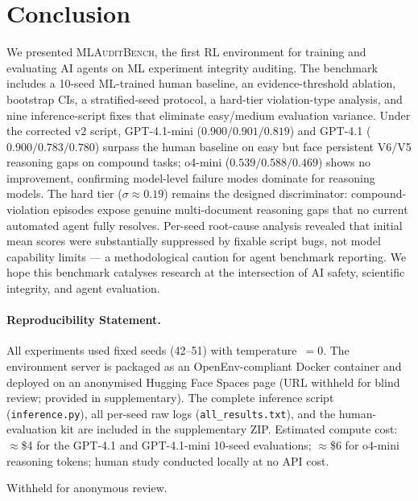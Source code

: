 \documentclass{article}
\begin{document}
\section{Conclusion}

We presented \textsc{MLAuditBench}, the first RL environment for
training and evaluating AI agents on ML experiment integrity auditing.
The benchmark includes a 10-seed ML-trained human baseline, an
evidence-threshold ablation, bootstrap CIs, a stratified-seed protocol,
a hard-tier violation-type analysis, and nine inference-script fixes that
eliminate easy/medium evaluation variance.  Under the corrected v2 script,
GPT-4.1-mini ($0.900/0.901/0.819$) and GPT-4.1 ($0.900/0.783/0.780$)
surpass the human baseline on easy but face persistent V6/V5 reasoning
gaps on compound tasks; o4-mini ($0.539/0.588/0.469$) shows no
improvement, confirming model-level failure modes dominate for reasoning
models.  The hard tier ($\sigma{\approx}0.19$) remains the designed
discriminator: compound-violation episodes expose genuine multi-document
reasoning gaps that no current automated agent fully resolves.
Per-seed root-cause analysis revealed that initial mean scores were
substantially suppressed by fixable script bugs, not model capability
limits --- a methodological caution for agent benchmark reporting.
We hope this benchmark catalyses research at the intersection of AI
safety, scientific integrity, and agent evaluation.

\paragraph{Reproducibility Statement.}
All experiments used fixed seeds (42--51) with temperature~$= 0$.
The environment server is packaged as an OpenEnv-compliant Docker container
and deployed on an anonymised Hugging Face Spaces page (URL withheld for
blind review; provided in supplementary).
The complete inference script (\texttt{inference.py}), all per-seed raw
logs (\texttt{all\_results.txt}), and the human-evaluation kit are included
in the supplementary ZIP.
Estimated compute cost: ${\approx}$\$4 for the GPT-4.1 and GPT-4.1-mini
10-seed evaluations; ${\approx}$\$6 for o4-mini reasoning tokens; human
study conducted locally at no API cost.

\begin{ack}
Withheld for anonymous review.
\end{ack}
\end{document}
